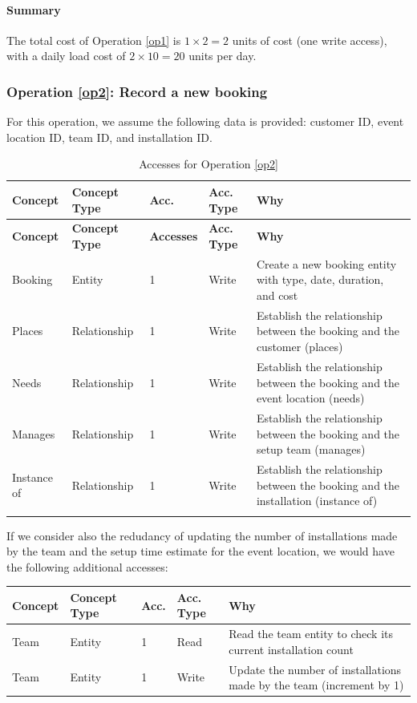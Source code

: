 \paragraph{Summary}
The total cost of Operation \ref{op1} is $1 \times 2 = 2$ units of cost (one write access), with a daily load cost of $2 \times 10 = 20$ units per day.

\subsubsection{Operation \ref{op2}: Record a new booking}

For this operation, we assume the following data is provided: customer ID, event location ID, team ID, and installation ID.

\begin{longtable}[H]{|p{2cm}|p{2cm}|p{1cm}|p{1cm}|p{7cm}|}
    \hline
    \textbf{Concept} & \textbf{Concept Type} & \textbf{Acc.} & \textbf{Acc. Type} & \textbf{Why} \\
    \hline
    \endfirsthead
    \hline
    \textbf{Concept} & \textbf{Concept Type} & \textbf{Accesses} & \textbf{Acc. Type} & \textbf{Why} \\
    \hline
    \endhead
    Booking & Entity & 1 & Write & Create a new booking entity with type, date, duration, and cost \\
    \hline
    Places & Relationship & 1 & Write & Establish the relationship between the booking and the customer (places) \\
    \hline
    Needs & Relationship & 1 & Write & Establish the relationship between the booking and the event location (needs) \\
    \hline
    Manages & Relationship & 1 & Write & Establish the relationship between the booking and the setup team (manages) \\
    \hline
    Instance of & Relationship & 1 & Write & Establish the relationship between the booking and the installation (instance of) \\
    \hline
    \caption{Accesses for Operation \ref{op2}}
    \label{tab:op2-accesses-logical}
\end{longtable}

If we consider also the redudancy of updating the number of installations made by the team and the setup time estimate for the event location, we would have the following additional accesses:

\begin{longtable}[H]{|p{2cm}|p{2cm}|p{1cm}|p{1cm}|p{7cm}|}
    \hline
    \textbf{Concept} & \textbf{Concept Type} & \textbf{Acc.} & \textbf{Acc. Type} & \textbf{Why} \\
    \hline
    Team & Entity & 1 & Read & Read the team entity to check its current installation count \\
    \hline
    Team & Entity & 1 & Write & Update the number of installations made by the team (increment by 1) \\
    \hline
\end{longtable}

